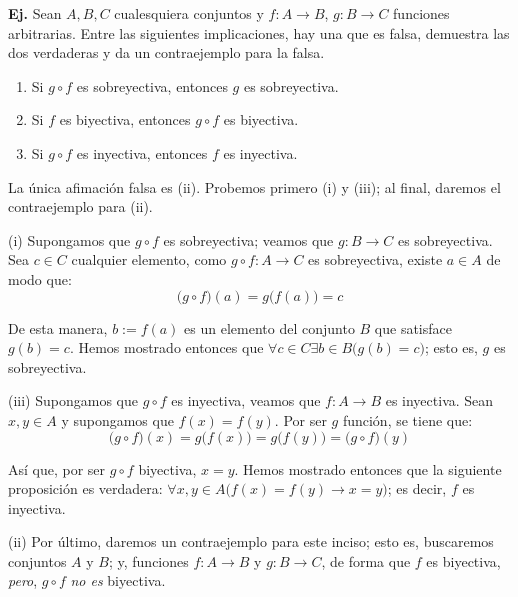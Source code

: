 \documentclass[letterpaper,DIV=14,headsepline,12pt]{scrartcl}
\makeatletter
\newcounter{Ejer}
\newcommand{\pts}{}
\newenvironment{ejercicio}[1]{\noindent
    \ifthenelse{\equal{#1}{1} \OR \equal{#1}{+1}}{\renewcommand{\pts}{\textbf{(#1 pt)}}}{\renewcommand{\pts}{\textbf{(#1 pts)}}}\textbf{Ej. \theEjer} \pts\stepcounter{Ejer}}{\vspace{.3cm}}
\newenvironment{solu}[1][]{%
        \par\pushQED{\hfill \lozenge}%
        \normalfont\topsep6pt \partopsep0pt %
        \trivlist
        \item[\hskip\labelsep
                \textbf{\textit{Solución.}}%
        ]#1
        }{%
        \popQED\endtrivlist\@endpefalse
    }
\makeatother
\begin{document}
    \begin{ejercicio}{1}
        Sean $A,B,C$ cualesquiera conjuntos y $f\colon A \to B$, $g\colon B \to C$ funciones arbitrarias. Entre las siguientes implicaciones, hay una que es falsa, demuestra las dos verdaderas y da un contraejemplo para la falsa.
        \begin{enumerate}
            \item Si $g \circ f$ es sobreyectiva, entonces $g$ es sobreyectiva.
            \item Si $f$ es biyectiva, entonces $g \circ f$ es biyectiva.
            \item Si $g \circ f$ es inyectiva, entonces $f$ es inyectiva.
        \end{enumerate}
    \end{ejercicio}
    \begin{solu}
        La única afimación falsa es (ii). Probemos primero (i) y (iii); al final, daremos el contraejemplo para (ii).

        (i) Supongamos que $g \circ f$ es sobreyectiva; veamos que $g \colon B \to C$ es sobreyectiva. Sea $c \in C$ cualquier elemento, como $g \circ f \colon A \to C$ es sobreyectiva, existe $a \in A$ de modo que:
        \[ \big(g \circ f\big) (a) = g \big( f(a) \big)=c \]

        De esta manera, $b:=f(a)$ es un elemento del conjunto $B$ que satisface $g(b)=c$. Hemos mostrado entonces que $\forall c \in C \exists b \in B \big(g(b)=c\big)$; esto es, $g$ es sobreyectiva.

        (iii) Supongamos que $g \circ f$ es inyectiva, veamos que $f:A \to B$ es inyectiva. Sean $x,y \in A$ y supongamos que $f(x)=f(y)$. Por ser $g$ función, se tiene que:
        \[ \big(g \circ f\big) (x) = g\big( f(x) \big) = g\big( f(y) \big) = \big(g \circ f\big) (y) \]

        Así que, por ser $g \circ f$ biyectiva, $x=y$. Hemos mostrado entonces que la siguiente proposición es verdadera: $\forall x,y \in A \big( f(x)=f(y) \to x=y \big)$; es decir, $f$ es inyectiva.

        (ii) Por último, daremos un contraejemplo para este inciso; esto es, buscaremos conjuntos $A$ y $B$; y, funciones $f\colon A \to B$ y $g\colon B \to C$, de forma que $f$ es biyectiva, \textit{pero}, $g \circ f$ \textit{no es} biyectiva.


\end{solu}
\end{document}
